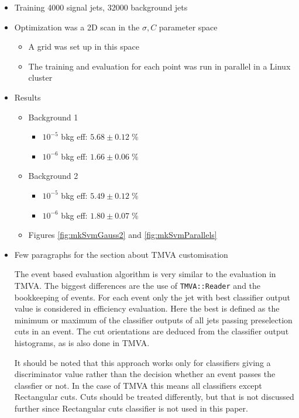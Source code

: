 \begin{itemize}
\item Training 4000 signal jets, 32000 background jets
\item Optimization was a 2D scan in the $\sigma, C$ parameter space
  \begin{itemize}
  \item A grid was set up in this space
  \item The training and evaluation for each point was run in parallel in a Linux cluster
  \end{itemize}
\item Results
  \begin{itemize}
  \item Background 1
    \begin{itemize}
    \item $10^{-5}$ bkg eff: $5.68\pm 0.12\;\%$
    \item $10^{-6}$ bkg eff: $1.66\pm 0.06\;\%$
    \end{itemize}
  \item Background 2
    \begin{itemize}
    \item $10^{-5}$ bkg eff: $5.49\pm 0.12\;\%$
    \item $10^{-6}$ bkg eff: $1.80\pm 0.07\;\%$
    \end{itemize}
  \item Figures \ref{fig:mkSvmGauss2} and \ref{fig:mkSvmParallels}
  \end{itemize}
\item Few paragraphs for the section about TMVA customisation

  The event based evaluation algorithm is very similar to the
  evaluation in TMVA. The biggest differences are the use of
  \texttt{TMVA::Reader} and the bookkeeping of events. For each event
  only the jet with best classifier output value is considered in
  efficiency evaluation. Here the best is defined as the minimum or
  maximum of the classifier outputs of all jets passing preselection
  cuts in an event. The cut orientations are deduced from the
  classifier output histograms, as is also done in TMVA.

  It should be noted that this approach works only for classifiers
  giving a discriminator value rather than the decision whether an
  event passes the classfier or not. In the case of TMVA this means
  all classifiers except Rectangular cuts. Cuts should be treated
  differently, but that is not discussed further since Rectangular
  cuts classifier is not used in this paper.
\end{itemize}

